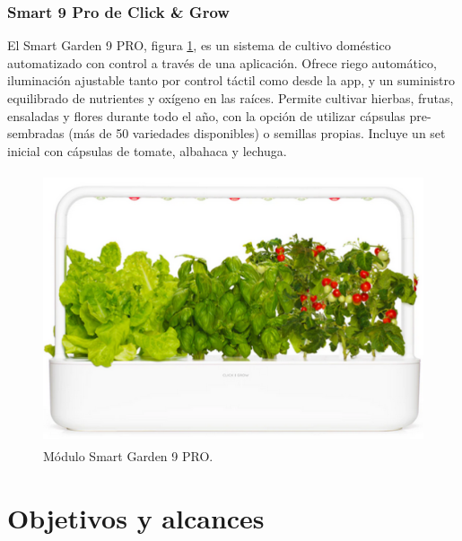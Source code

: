 
\subsubsection{Smart 9 Pro de Click \& Grow}
El Smart Garden 9 PRO, figura \ref{fig:smart_garden}, es un sistema de cultivo doméstico automatizado con control a través de una aplicación. Ofrece riego automático, iluminación ajustable tanto por control táctil como desde la app, y un suministro equilibrado de nutrientes y oxígeno en las raíces. Permite cultivar hierbas, frutas, ensaladas y flores durante todo el año, con la opción de utilizar cápsulas pre-sembradas (más de 50 variedades disponibles) o semillas propias. Incluye un set inicial con cápsulas de tomate, albahaca y lechuga.

\begin{figure}[h]
	\centering
	\includegraphics[height=8cm]{./Figures/smart_garden.png}
	\caption{Módulo Smart Garden 9 PRO.}
	\label{fig:smart_garden}
\end{figure}


\section{Objetivos y alcances}


